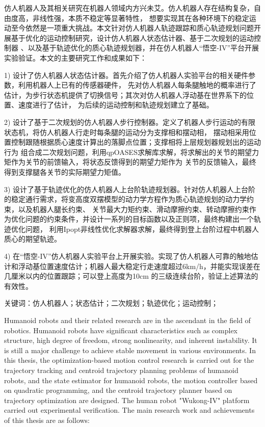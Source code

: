 \cleardoublepage
{}

仿人机器人及其相关研究在机器人领域内方兴未艾。仿人机器人存在结构复杂，自由度高，非线性强，本质不稳定等显著特性，
想要实现其在各种环境下的稳定运动至今依然是一项重大挑战。本文针对仿人机器人轨迹跟踪和质心轨迹规划问题开展基于优化的运动控制研究，设计仿人机器人状态估计器、基于二次规划的运动控制器
、以及基于轨迹优化的质心轨迹规划器，并在仿人机器人“悟空-IV”平台开展实验验证。本文的主要研究工作和成果如下：

1) 设计了仿人机器人状态估计器。首先介绍了仿人机器人实验平台的相关硬件参数，利用机器人上已有的传感器硬件，
先对仿人机器人每条腿触地的概率进行了估计，为步行状态机提供了切换信号；其次对仿人机器人浮动基在世界系下的位置、速度进行了估计，
为后续的运动控制和轨迹规划建立了基础。

2) 设计了基于二次规划的仿人机器人步行控制器。定义了机器人步行运动的有限状态机，将仿人机器人行走时每条腿的运动分为支撑相和摆动相，
摆动相采用位置控制跟随根据质心速度计算出的落脚点位置；支撑相将上层规划器规划出的运动行为
组合成二次规划问题，利用qpOASES求解库求解，将求解出的关节的期望力矩作为关节的前馈输入，将状态反馈得到的期望力矩作为
关节的反馈输入，最终得到支撑腿各关节的实际期望力矩值。

3) 设计了基于轨迹优化的仿人机器人上台阶轨迹规划器。针对仿人机器人上台阶的稳定通行需求，将变高度双摆模型的动力学方程作为质心轨迹规划的动力学约束，以及机器人腿长约束、
关节最大力矩约束、滑动摩擦约束、转动摩擦约束作为优化问题的约束条件，并设计一系列的目标函数以及正则项，最终构建出一个轨迹优化问题，
利用Ipopt非线性优化求解器求解，最终得到登上台阶过程中机器人质心的期望轨迹。

4) 在“悟空-IV”仿人机器人实验平台上开展实验。实现了仿人机器人可靠的触地估计和浮动基位置速度估计；机器人最大稳定行走速度超过6km/h，并能实现误差在几厘米以内的位置跟踪；可以登上高度为10cm
的三级连续台阶，验证上述算法的有效性。

$\textbf{关键词}$：仿人机器人；状态估计；二次规划；轨迹优化；运动控制；

\cleardoublepage
{}

Humanoid robots and their related research are in the ascendant in the field of robotics. Humanoid robots have significant characteristics such as complex structure, 
high degree of freedom, strong nonlinearity, and inherent instability. It is still a major challenge to achieve stable movement in various environments. In this thesis, 
the optimization-based motion control research is carried out for the trajectory tracking and centroid trajectory planning problems of humanoid robots, 
and the state estimator for humanoid robots, the motion controller based on quadratic programming, and the centroid trajectory planner based on 
trajectory optimization are designed. The human robot "Wukong-IV" platform carried out experimental verification. The main research work and achievements of this thesis 
are as follows:

